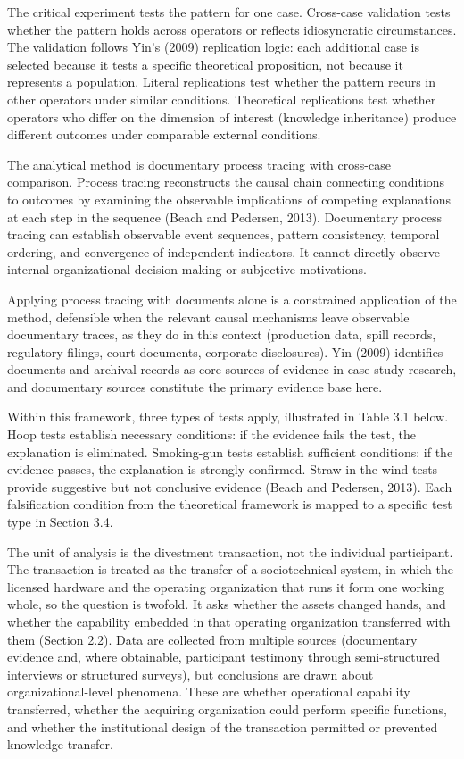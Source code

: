 The critical experiment tests the pattern for one case. Cross-case
validation tests whether the pattern holds across operators or reflects
idiosyncratic circumstances. The validation follows Yin's (2009)
replication logic: each additional case is selected because it tests a
specific theoretical proposition, not because it represents a
population. Literal replications test whether the pattern recurs in
other operators under similar conditions. Theoretical replications test
whether operators who differ on the dimension of interest (knowledge
inheritance) produce different outcomes under comparable external
conditions.

The analytical method is documentary process tracing with cross-case
comparison. Process tracing reconstructs the causal chain connecting
conditions to outcomes by examining the observable implications of
competing explanations at each step in the sequence (Beach and Pedersen,
2013). Documentary process tracing can establish observable event
sequences, pattern consistency, temporal ordering, and convergence of
independent indicators. It cannot directly observe internal
organizational decision-making or subjective motivations.

Applying process tracing with documents alone is a constrained
application of the method, defensible when the relevant causal
mechanisms leave observable documentary traces, as they do in this
context (production data, spill records, regulatory filings, court
documents, corporate disclosures). Yin (2009) identifies documents and
archival records as core sources of evidence in case study research, and
documentary sources constitute the primary evidence base here.

Within this framework, three types of tests apply, illustrated in Table
3.1 below. Hoop tests establish necessary conditions: if the evidence
fails the test, the explanation is eliminated. Smoking-gun tests
establish sufficient conditions: if the evidence passes, the explanation
is strongly confirmed. Straw-in-the-wind tests provide suggestive but
not conclusive evidence (Beach and Pedersen, 2013). Each falsification
condition from the theoretical framework is mapped to a specific test
type in Section 3.4.

The unit of analysis is the divestment transaction, not the individual
participant. The transaction is treated as the transfer of a
sociotechnical system, in which the licensed hardware and the operating
organization that runs it form one working whole, so the question is
twofold. It asks whether the assets changed hands, and whether the
capability embedded in that operating organization transferred with them
(Section 2.2). Data are collected from multiple sources (documentary
evidence and, where obtainable, participant testimony through
semi-structured interviews or structured surveys), but conclusions are
drawn about organizational-level phenomena. These are whether
operational capability transferred, whether the acquiring organization
could perform specific functions, and whether the institutional design
of the transaction permitted or prevented knowledge transfer.

